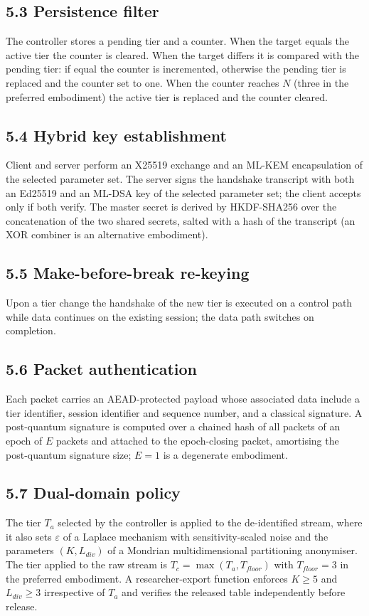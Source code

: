 \documentclass[11pt,a4paper]{article}
\begin{document}
\subsection*{5.3 Persistence filter}
The controller stores a pending tier and a counter. When the target equals the active tier the counter is cleared. When the target differs it is compared with the pending tier: if equal the counter is incremented, otherwise the pending tier is replaced and the counter set to one. When the counter reaches $N$ (three in the preferred embodiment) the active tier is replaced and the counter cleared.

\subsection*{5.4 Hybrid key establishment}
Client and server perform an X25519 exchange and an ML-KEM encapsulation of the selected parameter set. The server signs the handshake transcript with both an Ed25519 and an ML-DSA key of the selected parameter set; the client accepts only if both verify. The master secret is derived by HKDF-SHA256 over the concatenation of the two shared secrets, salted with a hash of the transcript (an XOR combiner is an alternative embodiment).

\subsection*{5.5 Make-before-break re-keying}
Upon a tier change the handshake of the new tier is executed on a control path while data continues on the existing session; the data path switches on completion.

\subsection*{5.6 Packet authentication}
Each packet carries an AEAD-protected payload whose associated data include a tier identifier, session identifier and sequence number, and a classical signature. A post-quantum signature is computed over a chained hash of all packets of an epoch of $E$ packets and attached to the epoch-closing packet, amortising the post-quantum signature size; $E=1$ is a degenerate embodiment.

\subsection*{5.7 Dual-domain policy}
The tier $T_a$ selected by the controller is applied to the de-identified stream, where it also sets $\varepsilon$ of a Laplace mechanism with sensitivity-scaled noise and the parameters $(K,L_{div})$ of a Mondrian multidimensional partitioning anonymiser. The tier applied to the raw stream is $T_c=\max(T_a,T_{floor})$ with $T_{floor}=3$ in the preferred embodiment. A researcher-export function enforces $K\ge5$ and $L_{div}\ge3$ irrespective of $T_a$ and verifies the released table independently before release.
\end{document}
